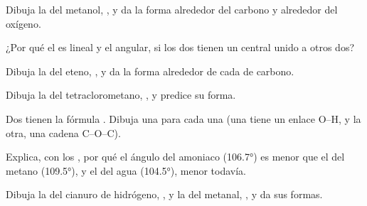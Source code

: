 \begin{exercise}[$\star\star$]\label{exo:g10:lewis-and-shape:8}
Dibuja la  del metanol, , y da la forma
alrededor del carbono y alrededor del oxígeno.
\end{exercise}

\begin{exercise}[$\star\star$]\label{exo:g10:lewis-and-shape:9}
¿Por qué el  es lineal y el  angular, si los dos tienen
un  central unido a otros dos?
\end{exercise}

\begin{exercise}[$\star\star$]\label{exo:g10:lewis-and-shape:10}
Dibuja la  del eteno, , y da la forma
alrededor de cada  de carbono.
\end{exercise}

\begin{exercise}[$\star\star$]\label{exo:g10:lewis-and-shape:11}
Dibuja la  del tetraclorometano, , y
predice su forma.
\end{exercise}

\begin{exercise}[$\star\star\star$]\label{exo:g10:lewis-and-shape:12}
Dos  tienen la fórmula . Dibuja una  para cada una (una tiene un enlace O--H, y la otra, una cadena
C--O--C).
\end{exercise}

\begin{exercise}[$\star\star\star$]\label{exo:g10:lewis-and-shape:13}
Explica, con los , por qué el ángulo del amoniaco
(\ang{106.7}) es menor que el del metano (\ang{109.5}), y el del agua
(\ang{104.5}), menor todavía.
\end{exercise}

\begin{exercise}[$\star\star\star$]\label{exo:g10:lewis-and-shape:14}
Dibuja la  del cianuro de hidrógeno, , y la
del metanal, , y da sus formas.
\end{exercise}

